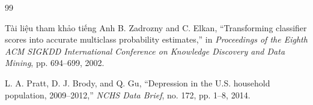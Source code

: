 \documentclass{uetgraduation}
\begin{document}
\begin{thebibliography}{99}
\begin{bibsection}{Tài liệu tham khảo tiếng Anh}
    B. Zadrozny and C. Elkan,
    ``Transforming classifier scores into accurate multiclass probability estimates,''
    in \textit{Proceedings of the Eighth ACM SIGKDD International Conference on Knowledge Discovery and Data Mining}, pp. 694--699, 2002.

    L. A. Pratt, D. J. Brody, and Q. Gu,
    ``Depression in the {U.S.} household population, 2009--2012,''
    \textit{NCHS Data Brief}, no. 172, pp. 1--8, 2014.
\end{bibsection}

\end{thebibliography}
\end{document}
